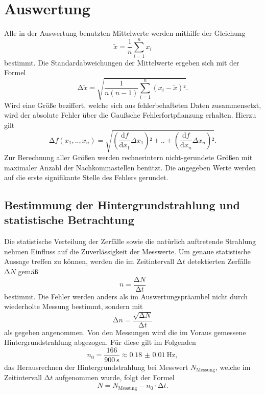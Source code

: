 \newpage
\section{Auswertung}
\label{sec:Auswertung}
Alle in der Auswertung benutzten Mittelwerte werden mithilfe der Gleichung
\begin{equation}
\tilde{x}=\frac{1}{n}\sum_{i=1}^n {x_i}
\end{equation}
bestimmt. Die Standardabweichungen der Mittelwerte ergeben sich mit der Formel
\begin{equation}
\mathup\Delta{\tilde{x}}=\sqrt{\frac{1}{n(n-1)}\sum_{i=1}^n {(x_i-\tilde{x})²}}.
\end{equation}
Wird eine Größe beziffert, welche sich aus fehlerbehafteten Daten zusammensetzt, wird der absolute Fehler über die Gaußsche Fehlerfortpflanzung erhalten.
Hierzu gilt
\begin{equation}
\mathup\Delta{f}(x_1,..,x_n)=\sqrt{\left(\frac{\mathup{d}f}{\mathup{d}x_1}\Delta{x_1}\right)²+..+\left(\frac{\mathup{d}f}{\mathup{d}x_n}\Delta{x_n}\right)²}.
\end{equation}
Zur Berechnung aller Größen werden rechnerintern nicht-gerundete Größen mit maximaler Anzahl der Nachkommastellen benützt.
Die angegeben Werte werden auf die erste signifikante Stelle des Fehlers gerundet.

\subsection{Bestimmung der Hintergrundstrahlung und statistische Betrachtung}
\label{sec:Auswertung_hintergrund}
Die statistische Verteilung der Zerfälle sowie die natürlich auftretende Strahlung nehmen Einfluss auf die Zuverlässigkeit der Messwerte.
Um genaue statistische Aussage treffen zu können, werden die im Zeitintervall $\mathup\Delta t$ detektierten Zerfälle $\mathup\Delta N$ gemäß
\begin{equation}
	n=\frac{\mathup\Delta N}{\mathup\Delta t}
\end{equation}
bestimmt.
Die Fehler werden anders als im Auswertungspräambel nicht durch wiederholte Messung bestimmt, sondern mit
\begin{equation}
	\mathup\Delta n=\frac{\sqrt{\mathup\Delta N}}{\mathup\Delta t}
\end{equation}
als gegeben angenommen.
Von den Messungen wird die im Voraus gemessene Hintergrundstrahlung abgezogen. 
Für diese gilt im Folgenden
\begin{equation}
	n_0=\frac{166}{\SI{900}{\second}}\approx\SI{0.18(1)}{\hertz},
\end{equation}
das Herausrechnen der Hintergrundstrahlung bei Messwert $N_\text{Messung}$, welche im Zeitintervall $\mathup\Delta t$ aufgenommen wurde, folgt der Formel
\begin{equation}
	N=N_{\text{Messung}}-n_0\cdot\mathup\Delta t.
\end{equation}


